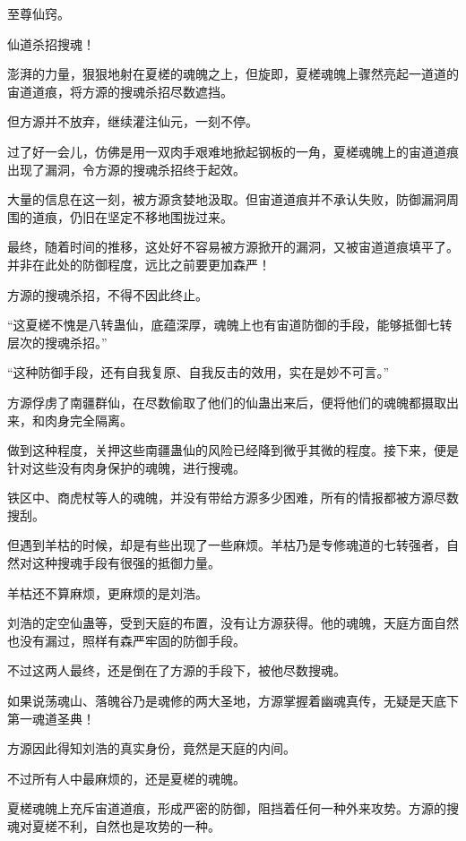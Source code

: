
\begin{this_body}

至尊仙窍。

仙道杀招搜魂！

澎湃的力量，狠狠地射在夏槎的魂魄之上，但旋即，夏槎魂魄上骤然亮起一道道的宙道道痕，将方源的搜魂杀招尽数遮挡。

但方源并不放弃，继续灌注仙元，一刻不停。

过了好一会儿，仿佛是用一双肉手艰难地掀起钢板的一角，夏槎魂魄上的宙道道痕出现了漏洞，令方源的搜魂杀招终于起效。

大量的信息在这一刻，被方源贪婪地汲取。但宙道道痕并不承认失败，防御漏洞周围的道痕，仍旧在坚定不移地围拢过来。

最终，随着时间的推移，这处好不容易被方源掀开的漏洞，又被宙道道痕填平了。并非在此处的防御程度，远比之前要更加森严！

方源的搜魂杀招，不得不因此终止。

“这夏槎不愧是八转蛊仙，底蕴深厚，魂魄上也有宙道防御的手段，能够抵御七转层次的搜魂杀招。”

“这种防御手段，还有自我复原、自我反击的效用，实在是妙不可言。”

方源俘虏了南疆群仙，在尽数偷取了他们的仙蛊出来后，便将他们的魂魄都摄取出来，和肉身完全隔离。

做到这种程度，关押这些南疆蛊仙的风险已经降到微乎其微的程度。接下来，便是针对这些没有肉身保护的魂魄，进行搜魂。

铁区中、商虎杖等人的魂魄，并没有带给方源多少困难，所有的情报都被方源尽数搜刮。

但遇到羊枯的时候，却是有些出现了一些麻烦。羊枯乃是专修魂道的七转强者，自然对这种搜魂手段有很强的抵御力量。

羊枯还不算麻烦，更麻烦的是刘浩。

刘浩的定空仙蛊等，受到天庭的布置，没有让方源获得。他的魂魄，天庭方面自然也没有漏过，照样有森严牢固的防御手段。

不过这两人最终，还是倒在了方源的手段下，被他尽数搜魂。

如果说荡魂山、落魄谷乃是魂修的两大圣地，方源掌握着幽魂真传，无疑是天底下第一魂道圣典！

方源因此得知刘浩的真实身份，竟然是天庭的内间。

不过所有人中最麻烦的，还是夏槎的魂魄。

夏槎魂魄上充斥宙道道痕，形成严密的防御，阻挡着任何一种外来攻势。方源的搜魂对夏槎不利，自然也是攻势的一种。


\end{this_body}
